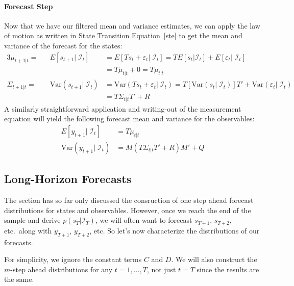 \documentclass[a4paper,12pt]{article}
\begin{document}
\paragraph{Forecast Step} Now that we have our filtered mean and
variance estimates, we can apply the law of motion as written in State
Transition Equation~\ref{ste} to get the mean and variance of the
forecast for the states:
\begin{alignat*}{3}
  \mu_{t+1|t} =&& E[s_{t+1}|\;\mathcal{I}_{t}] &= 
    E[Ts_t + \varepsilon_t |\;\mathcal{I}_{t}] = 
    TE[s_t | \mathcal{I}_{t}] 
    + E[\varepsilon_t |\;\mathcal{I}_{t}]  \\
    && &= T\mu_{t|t} + 0 = T\mu_{t|t} \\
  \Sigma_{t+1|t} = &&\text{Var}(s_{t+1}|\;\mathcal{I}_{t})
  &= \text{Var}(Ts_t + \varepsilon_t |\;\mathcal{I}_{t})
  = T[\text{Var}(s_t|\;\mathcal{I}_{t})]T'
  + \text{Var}(\varepsilon_t|\;\mathcal{I}_{t}) \\
  && &= T\Sigma_{t|t}T' + R
\end{alignat*}
A similarly straightforward application and writing-out of
the measurement equation will yield the following forecast
mean and variance for the observables:
\begin{align*}
  E[y_{t+1}|\;\mathcal{I}_{t}] &= T\mu_{t|t} \\
  \text{Var}(y_{t+1}|\;\mathcal{I}_{t})
    &= M\left(T\Sigma_{t|t}T' + R\right)M' + Q
\end{align*}

\subsection{Long-Horizon Forecasts}

The section has so far only discussed the consruction of one step ahead
forecast distributions for states and observables. However, once we
reach the end of the sample and derive $p(s_T | \mathcal{I}_{T})$, we
will often want to forecast $s_{T+1}$, $s_{T+2}$, etc.\ along with
$y_{T+1}$, $y_{T+2}$, etc. So let's now characterize the distributions
of our forecasts. 

For simplicity, we ignore the constant terms $C$ and $D$. We will also construct the $m$-step ahead distributions for any $t=1,\ldots,T$, not just $t=T$ since the results are the same.
\end{document}
